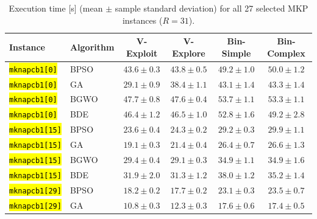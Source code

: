 \documentclass[mathematics,article,accept,moreauthors]{Definitions/mdpi}
\begin{document}

\begin{table}[H]
\caption{Execution time [s] (mean $\pm$ sample standard deviation) for all 27 selected MKP instances ($R=31$).}\label{tab:computational_cost_all_instances}

  \footnotesize
  \setlength{\tabcolsep}{4pt}

  \begin{tabularx}{\textwidth}{XLCCCC}

\toprule
\textbf{Instance} & \textbf{Algorithm} & \textbf{V-Exploit} & \textbf{V-Explore} & \textbf{Bin-Simple} & \textbf{Bin-Complex} \\
\midrule





\texttt{\hl{mknapcb1[0]}} & BPSO  &  $\mathbf{43.6 \pm 0.3}$ &           $43.8 \pm 0.5$ &           $49.2 \pm 1.0$ &           $50.0 \pm 1.2$ \\
    \texttt{\hl{mknapcb1[0]}} & GA    &  $\mathbf{29.1 \pm 0.9}$ &           $38.4 \pm 1.1$ &           $43.1 \pm 1.4$ &           $43.3 \pm 1.4$ \\
    \texttt{\hl{mknapcb1[0]}} & BGWO  &           $47.7 \pm 0.8$ &  $\mathbf{47.6 \pm 0.4}$ &           $53.7 \pm 1.1$ &           $53.3 \pm 1.1$ \\
    \texttt{\hl{mknapcb1[0]}} & BDE   &  $\mathbf{46.4 \pm 1.2}$ &           $46.5 \pm 1.0$ &           $52.8 \pm 1.6$ &           $49.2 \pm 2.8$ \\
    \midrule
    \texttt{\hl{mknapcb1[15]}} & BPSO  &  $\mathbf{23.6 \pm 0.4}$ &           $24.3 \pm 0.2$ &           $29.2 \pm 0.3$ &           $29.9 \pm 1.1$ \\
    \texttt{\hl{mknapcb1[15]}} & GA    &  $\mathbf{19.1 \pm 0.3}$ &           $21.4 \pm 0.4$ &           $26.4 \pm 0.7$ &           $26.6 \pm 1.3$ \\
    \texttt{\hl{mknapcb1[15]}} & BGWO  &           $29.4 \pm 0.4$ &  $\mathbf{29.1 \pm 0.3}$ &           $34.9 \pm 1.1$ &           $34.9 \pm 1.6$ \\
    \texttt{\hl{mknapcb1[15]}} & BDE   &           $31.9 \pm 2.0$ &  $\mathbf{31.3 \pm 1.2}$ &           $38.0 \pm 1.2$ &           $35.2 \pm 1.4$ \\
    \midrule
    \texttt{\hl{mknapcb1[29]}} & BPSO  &           $18.2 \pm 0.2$ &  $\mathbf{17.7 \pm 0.2}$ &           $23.1 \pm 0.3$ &           $23.5 \pm 0.7$ \\
    \texttt{\hl{mknapcb1[29]}} & GA    &  $\mathbf{10.8 \pm 0.3}$ &           $12.3 \pm 0.3$ &           $17.6 \pm 0.6$ &           $17.4 \pm 0.5$ \\

\end{tabularx}
\end{table}
\end{document}
